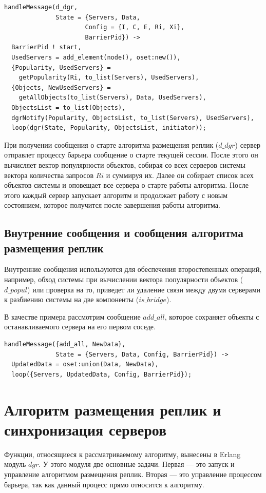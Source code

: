 			\begin{lstlisting}
handleMessage(d_dgr, 
              State = {Servers, Data, 
                      Config = {I, C, E, Ri, Xi}, 
                      BarrierPid}) ->
  BarrierPid ! start,
  UsedServers = add_element(node(), oset:new()),
  {Popularity, UsedServers} = 
    getPopularity(Ri, to_list(Servers), UsedServers),
  {Objects, NewUsedServers} = 
    getAllObjects(to_list(Servers), Data, UsedServers),
  ObjectsList = to_list(Objects),
  dgrNotify(Popularity, ObjectsList, to_list(Servers), UsedServers),
  loop(dgr(State, Popularity, ObjectsList, initiator));				
			\end{lstlisting}
			При получении сообщения о старте алгоритма размещения реплик ($d\_dgr$) сервер отправлет процессу барьера сообщение о старте текущей сессии. После этого он вычисляет вектор 
			популярности объектов, собирая со всех серверов системы вектора количества запросов $Ri$ и суммируя их. Далее он собирает список всех объектов системы и оповещает все сервера о старте 
			работы алгоритма. После этого каждый сервер запускает алгоритм и продолжает работу с новым состоянием, которое получится после завершения работы алгоритма.		
			
		\subsection{Внутренние сообщения и сообщения алгоритма размещения реплик}
			Внутренние сообщения используются для обеспечения второстепенных операций, например, обход системы при вычислении вектора популярности объектов ($d\_popul$) или проверка на то,
			приведет ли удаление связи между двумя серверами к разбиению системы на две компоненты ($is\_bridge$).

			В качестве примера рассмотрим сообщение $add\_all$, которое сохраняет объекты с останавливаемого сервера на его первом соседе.
			\begin{lstlisting}
handleMessage({add_all, NewData}, 
              State = {Servers, Data, Config, BarrierPid}) ->
  UpdatedData = oset:union(Data, NewData),
  loop({Servers, UpdatedData, Config, BarrierPid});		
			\end{lstlisting}

	\section{Алгоритм размещения реплик и синхронизация серверов}
		Функции, относящиеся к рассматриваемому алгоритму, вынесены в Erlang модуль $dgr$. У этого модуля две основные задачи. Первая --- это запуск и управление алгоритмом размещения реплик.
		Вторая --- это управление процессом барьера, так как данный процесс прямо относится к алгоритму.


